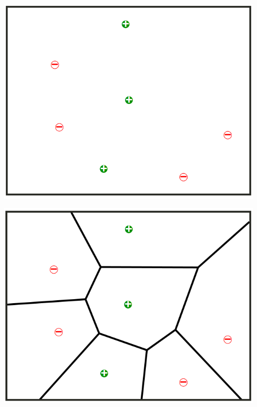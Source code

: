 \documentclass[fontsize=11pt]{scrartcl}
\newenvironment{Figure}
  {\par\medskip\noindent\minipage{\linewidth}}
  {\endminipage\par\medskip}
\begin{document}
            \begin{Figure}
                \begin{minipage}[b]{.4\linewidth}
                    \includegraphics[width=\linewidth]{vor1.png}
                \label{fig:v1}   
                \end{minipage}
                \hspace*{.1\linewidth}
                \begin{minipage}[b]{.4\linewidth}
                    \includegraphics[width=\linewidth]{vor2.png}
                    \label{fig:v2}
                \end{minipage}
            \end{Figure}
\end{document}
